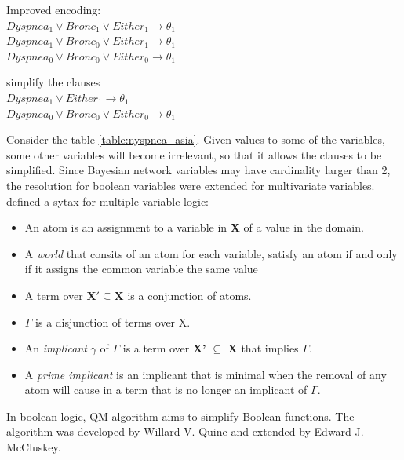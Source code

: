         \begin{multicols}{2}
        \centering
        \noindent Improved encoding:\\
        $Dyspnea_{1} \vee Bronc_{1} \vee Either_{1} \rightarrow \theta_{1}$\\
        $Dyspnea_{1} \vee Bronc_{0} \vee Either_{1} \rightarrow \theta_{1}$\\
        $Dyspnea_{0} \vee Bronc_{0} \vee Either_{0} \rightarrow \theta_{1}$\\

        \columnbreak
        
        \noindent simplify the clauses\\
        $Dyspnea_{1} \vee Either_{1} \rightarrow \theta_{1}$\\
        $Dyspnea_{0} \vee Bronc_{0} \vee Either_{0} \rightarrow \theta_{1}$\\
        \end{multicols}
        Consider the table \ref{table:nyspnea_asia}. Given values to some of the variables, some other variables will become irrelevant, so that it allows the clauses to be simplified. Since Bayesian network variables may have cardinality larger than 2, the resolution for boolean variables were extended for multi\-variate variables.\\
        
        \cite{2006-enc3} defined a sytax for multiple variable logic:
        \begin{itemize}
        \item An atom is an assignment to a variable in \textbf{X} of a value in the domain.
        \item A \textit{world} that consits of an atom for each variable, satisfy an atom if and only if it assigns the common variable the same value
        \item A term over $\textbf{X}' \subseteq \textbf{X}$ is a conjunction of atoms.
        \item $\Gamma$ is a disjunction of terms over X.
        \item An \textit{implicant} $\gamma$ of $\Gamma$ is a term over \textbf{X'} $\subseteq$ \textbf{X} that implies $\Gamma$.
        \item A \textit{prime implicant} is an implicant that is minimal when the removal of any atom will cause in a term that is no longer an implicant of $\Gamma$.
        \end{itemize}
        
       In boolean logic, QM algorithm aims to simplify Boolean functions. The algorithm was developed by Willard V. Quine and extended by Edward J. McCluskey.\\
        
